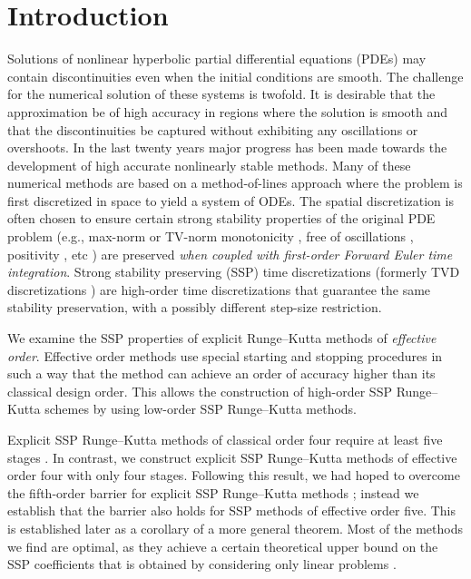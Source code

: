 \section{Introduction}\label{sec:Intro}
Solutions of nonlinear hyperbolic partial differential equations (PDEs) may 
contain discontinuities even when the initial conditions are smooth.
The challenge for the numerical solution of these systems is twofold. 
It is desirable that the approximation be of high accuracy in regions where 
the solution is smooth and that the discontinuities be captured without 
exhibiting any oscillations or overshoots. 
In the last twenty years major progress has been made towards the 
development of high accurate nonlinearly stable methods. 
Many of these numerical methods are based on a method-of-lines approach 
where the problem is first discretized in space to yield a system of ODEs. 
The spatial discretization is often chosen to ensure certain strong stability 
properties of the original PDE problem (e.g., max-norm or TV-norm monotonicity \cite{Gottlieb/Ketcheson/Shu:2009}, 
free of oscillations \cite{Shu/Osher:1988}, positivity \cite{Horvath:2005}, etc ) are preserved 
\emph{when coupled with first-order Forward Euler time integration}.
Strong stability preserving (SSP) time discretizations (formerly TVD
discretizations \cite{Gottlieb/Shu:1998}) are high-order time
discretizations that guarantee the same stability preservation, with a
possibly different step-size restriction.

We examine the SSP properties of explicit Runge--Kutta methods of 
\emph{effective order}. 
Effective order methods use special starting and stopping procedures
in such a way that the method can achieve an order of
accuracy higher than its classical design order.
This allows the construction of high-order SSP Runge--Kutta schemes by
using low-order SSP Runge--Kutta methods.

Explicit SSP Runge--Kutta methods of classical order four require at 
least five stages \cite{Gottlieb/Shu:1998}. 
In contrast, we construct explicit SSP Runge--Kutta methods
of effective order four with only four stages.
Following this result, we had hoped to overcome the fifth-order
barrier for explicit SSP Runge--Kutta methods \cite{Ruuth2002}; instead we
establish that the barrier also holds for SSP methods of effective
order five.
This is established later as a corollary of a more general theorem.
Most of the methods we find are optimal, as they achieve a certain theoretical
upper bound on the SSP coefficients that is obtained by considering only
linear problems \cite{Kraaijevanger1986}.

